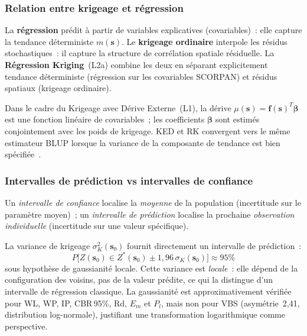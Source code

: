 \documentclass[10pt,a4paper,twocolumn]{article}
\newcommand{\bs}{\mathbf{s}}
\begin{document}
	\subsubsection{Relation entre krigeage et régression}
	
	La \textbf{régression} prédit à partir de variables explicatives
	(covariables)~: elle capture la tendance déterministe $m(\bs)$.
	Le \textbf{krigeage ordinaire} interpole les résidus stochastiques~:
	il capture la structure de corrélation spatiale résiduelle.
	La \textbf{Régression Kriging}~(L2a) combine les deux en séparant
	explicitement tendance déterministe (régression sur les covariables
	SCORPAN) et résidus spatiaux (krigeage ordinaire).
	
	Dans le cadre du Krigeage avec Dérive Externe~(L1), la dérive
	$\mu(\bs)=\mathbf{f}(\bs)^T\bm{\beta}$ est une fonction linéaire
	de covariables~; les coefficients $\bm{\beta}$ sont estimés
	conjointement avec les poids de krigeage. KED et RK convergent
	vers le même estimateur BLUP lorsque la variance de la composante
	de tendance est bien spécifiée~\cite{cressie1993statistics}.
	
	\subsubsection{Intervalles de prédiction vs intervalles de confiance}
	
	Un \emph{intervalle de confiance} localise la \emph{moyenne} de la
	population (incertitude sur le paramètre moyen)~; un
	\emph{intervalle de prédiction} localise la prochaine
	\emph{observation individuelle} (incertitude sur une valeur spécifique).
	
	La variance de krigeage $\sigma^2_K(\bs_0)$ fournit directement
	un intervalle de prédiction~:
	\begin{equation}
		P\!\bigl[Z(\bs_0)\in
		Z^*(\bs_0)\pm1{,}96\,\sigma_K(\bs_0)\bigr]\approx95\%
		\label{eq:ic95}
	\end{equation}
	sous hypothèse de gaussianité locale.
	Cette variance est \emph{locale}~: elle dépend de la configuration
	des voisins, pas de la valeur prédite, ce qui la distingue
	d'un intervalle de régression classique.
	La gaussianité est approximativement vérifiée pour WL, WP, IP,
	CBR\,95\%, Rd, $E_m$ et $P_l$, mais non pour VBS
	(asymétrie~2{,}41, distribution log-normale), justifiant
	une transformation logarithmique comme perspective.
	
\end{document}
